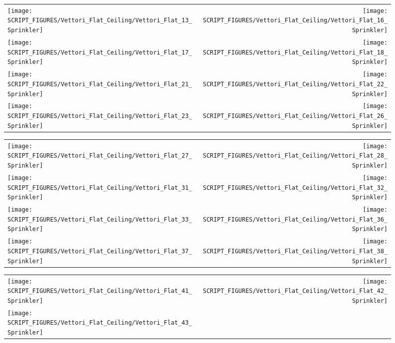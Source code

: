 \begin{figure}[p]
\begin{tabular*}{\textwidth}{l@{\extracolsep{\fill}}r}
\texttt{[image: SCRIPT\_FIGURES/Vettori\_Flat\_Ceiling/Vettori\_Flat\_13\_Sprinkler]} &
\texttt{[image: SCRIPT\_FIGURES/Vettori\_Flat\_Ceiling/Vettori\_Flat\_16\_Sprinkler]} \\
\texttt{[image: SCRIPT\_FIGURES/Vettori\_Flat\_Ceiling/Vettori\_Flat\_17\_Sprinkler]} &
\texttt{[image: SCRIPT\_FIGURES/Vettori\_Flat\_Ceiling/Vettori\_Flat\_18\_Sprinkler]} \\
\texttt{[image: SCRIPT\_FIGURES/Vettori\_Flat\_Ceiling/Vettori\_Flat\_21\_Sprinkler]} &
\texttt{[image: SCRIPT\_FIGURES/Vettori\_Flat\_Ceiling/Vettori\_Flat\_22\_Sprinkler]} \\
\texttt{[image: SCRIPT\_FIGURES/Vettori\_Flat\_Ceiling/Vettori\_Flat\_23\_Sprinkler]} &
\texttt{[image: SCRIPT\_FIGURES/Vettori\_Flat\_Ceiling/Vettori\_Flat\_26\_Sprinkler]}
\end{tabular*}
\end{figure}

\begin{figure}[p]
\begin{tabular*}{\textwidth}{l@{\extracolsep{\fill}}r}
\texttt{[image: SCRIPT\_FIGURES/Vettori\_Flat\_Ceiling/Vettori\_Flat\_27\_Sprinkler]} &
\texttt{[image: SCRIPT\_FIGURES/Vettori\_Flat\_Ceiling/Vettori\_Flat\_28\_Sprinkler]} \\
\texttt{[image: SCRIPT\_FIGURES/Vettori\_Flat\_Ceiling/Vettori\_Flat\_31\_Sprinkler]} &
\texttt{[image: SCRIPT\_FIGURES/Vettori\_Flat\_Ceiling/Vettori\_Flat\_32\_Sprinkler]} \\
\texttt{[image: SCRIPT\_FIGURES/Vettori\_Flat\_Ceiling/Vettori\_Flat\_33\_Sprinkler]} &
\texttt{[image: SCRIPT\_FIGURES/Vettori\_Flat\_Ceiling/Vettori\_Flat\_36\_Sprinkler]} \\
\texttt{[image: SCRIPT\_FIGURES/Vettori\_Flat\_Ceiling/Vettori\_Flat\_37\_Sprinkler]} &
\texttt{[image: SCRIPT\_FIGURES/Vettori\_Flat\_Ceiling/Vettori\_Flat\_38\_Sprinkler]}
\end{tabular*}
\end{figure}

\begin{figure}[p]
\begin{tabular*}{\textwidth}{l@{\extracolsep{\fill}}r}
\texttt{[image: SCRIPT\_FIGURES/Vettori\_Flat\_Ceiling/Vettori\_Flat\_41\_Sprinkler]} &
\texttt{[image: SCRIPT\_FIGURES/Vettori\_Flat\_Ceiling/Vettori\_Flat\_42\_Sprinkler]} \\
\texttt{[image: SCRIPT\_FIGURES/Vettori\_Flat\_Ceiling/Vettori\_Flat\_43\_Sprinkler]} &
\end{tabular*}
\end{figure}

